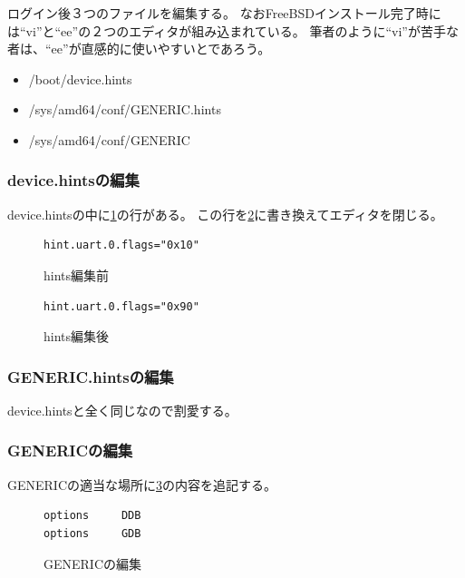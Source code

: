 \documentclass[a4j]{jarticle}
\begin{document}
ログイン後３つのファイルを編集する。
なおFreeBSDインストール完了時には``vi''と``ee''の２つのエディタが組み込まれている。
筆者のように``vi''が苦手な者は、``ee''が直感的に使いやすいとであろう。
\begin{itemize}
    \item /boot/device.hints
    \item /sys/amd64/conf/GENERIC.hints
    \item /sys/amd64/conf/GENERIC
\end{itemize}

\subsubsection{device.hintsの編集}
\label{sec:FreeBSD_device.hints}
device.hintsの中に\ref{fig:FreeBSD_bf_hints}の行がある。
この行を\ref{fig:FreeBSD_af_hints}に書き換えてエディタを閉じる。
\begin{figure}[htbp]
	\begin{center}
		\begin{lstlisting}[basicstyle=\ttfamily\footnotesize, frame=single, breaklines=true]
hint.uart.0.flags="0x10"
		\end{lstlisting}
	\end{center}
	\caption{hints編集前}
	\label{fig:FreeBSD_bf_hints}
\end{figure}

\begin{figure}[htbp]
	\begin{center}
		\begin{lstlisting}[basicstyle=\ttfamily\footnotesize, frame=single, breaklines=true]
hint.uart.0.flags="0x90"
		\end{lstlisting}
	\end{center}
	\caption{hints編集後}
	\label{fig:FreeBSD_af_hints}
\end{figure}

\subsubsection{GENERIC.hintsの編集}
device.hintsと全く同じなので割愛する。

\subsubsection{GENERICの編集}
GENERICの適当な場所に\ref{fig:FreeBSD_GENERIC}の内容を追記する。
\begin{figure}[htbp]
	\begin{center}
		\begin{lstlisting}[basicstyle=\ttfamily\footnotesize, frame=single, breaklines=true]
options     DDB
options     GDB
		\end{lstlisting}
	\end{center}
	\caption{GENERICの編集}
	\label{fig:FreeBSD_GENERIC}
\end{figure}
\end{document}
